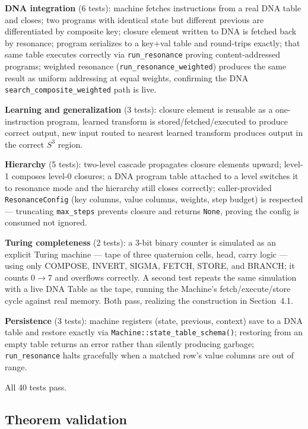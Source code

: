 \documentclass[12pt,a4paper]{article}
\begin{document}
\textbf{DNA integration} (6 tests): machine fetches instructions from a real DNA table and closes; two programs with identical state but different previous are differentiated by composite key; closure element written to DNA is fetched back by resonance; program serializes to a key+val table and round-trips exactly; that same table executes correctly via \texttt{run\_resonance} proving content-addressed programs; weighted resonance (\texttt{run\_resonance\_weighted}) produces the same result as uniform addressing at equal weights, confirming the DNA \texttt{search\_composite\_weighted} path is live.

\textbf{Learning and generalization} (3 tests): closure element is reusable as a one-instruction program, learned transform is stored/fetched/executed to produce correct output, new input routed to nearest learned transform produces output in the correct $S^3$ region.

\textbf{Hierarchy} (5 tests): two-level cascade propagates closure elements upward; level-1 composes level-0 closures; a DNA program table attached to a level switches it to resonance mode and the hierarchy still closes correctly; caller-provided \texttt{ResonanceConfig} (key columns, value columns, weights, step budget) is respected --- truncating \texttt{max\_steps} prevents closure and returns \texttt{None}, proving the config is consumed not ignored.

\textbf{Turing completeness} (2 tests): a 3-bit binary counter is simulated as an explicit Turing machine --- tape of three quaternion cells, head, carry logic --- using only COMPOSE, INVERT, SIGMA, FETCH, STORE, and BRANCH; it counts $0 \to 7$ and overflows correctly. A second test repeats the same simulation with a live DNA Table as the tape, running the Machine's fetch/execute/store cycle against real memory. Both pass, realizing the construction in Section~4.1.

\textbf{Persistence} (3 tests): machine registers (state, previous, context) save to a DNA table and restore exactly via \texttt{Machine::state\_table\_schema()}; restoring from an empty table returns an error rather than silently producing garbage; \texttt{run\_resonance} halts gracefully when a matched row's value columns are out of range.

All 40 tests pass.

\subsection{Theorem validation}
\end{document}
